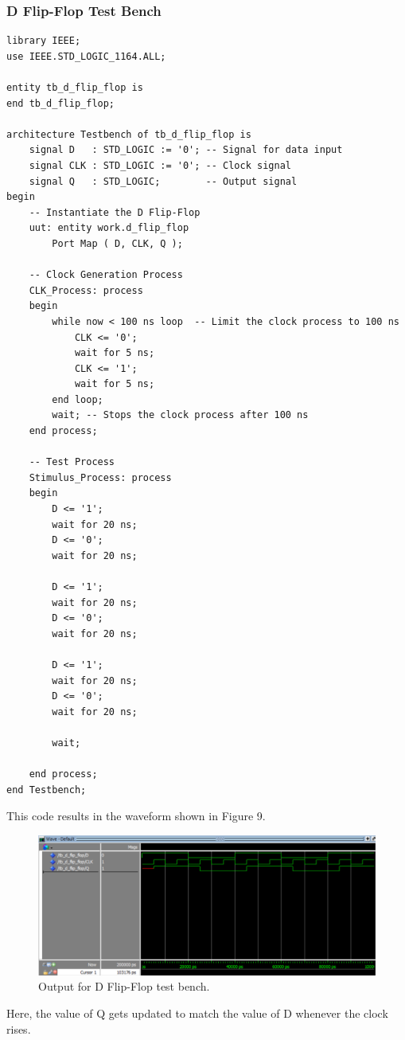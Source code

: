 \documentclass[12pt]{article}
\begin{document}
\subsubsection{D Flip-Flop Test Bench}
\begin{verbatim}
library IEEE;
use IEEE.STD_LOGIC_1164.ALL;

entity tb_d_flip_flop is
end tb_d_flip_flop;

architecture Testbench of tb_d_flip_flop is
    signal D   : STD_LOGIC := '0'; -- Signal for data input
    signal CLK : STD_LOGIC := '0'; -- Clock signal
    signal Q   : STD_LOGIC;        -- Output signal
begin
    -- Instantiate the D Flip-Flop
    uut: entity work.d_flip_flop
        Port Map ( D, CLK, Q );

    -- Clock Generation Process
    CLK_Process: process
    begin
        while now < 100 ns loop  -- Limit the clock process to 100 ns
            CLK <= '0';
            wait for 5 ns;
            CLK <= '1';
            wait for 5 ns;
        end loop;
        wait; -- Stops the clock process after 100 ns
    end process;

    -- Test Process
    Stimulus_Process: process
    begin
        D <= '1';
        wait for 20 ns;
        D <= '0';
        wait for 20 ns;

        D <= '1';
        wait for 20 ns;
        D <= '0';
        wait for 20 ns;

        D <= '1';
        wait for 20 ns;
        D <= '0';
        wait for 20 ns;

        wait;

    end process;
end Testbench;
\end{verbatim}

This code results in the waveform shown in Figure 9.
\begin{figure}[H]
\caption{Output for D Flip-Flop test bench.}
\centering
\includegraphics[width=\textwidth]{./diagrams/d_flipflop.png}
\end{figure}
Here, the value of Q gets updated to match the value of D whenever the clock rises.
\newpage
\end{document}
